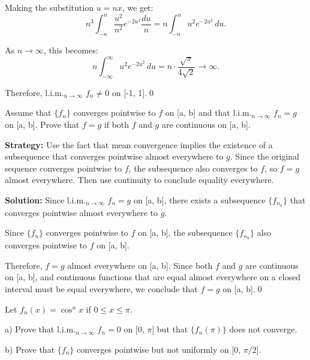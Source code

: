 Making the substitution \( u = nx \), we get:
\[n^3 \int_{-n}^n \frac{u^2}{n^2} e^{-2u^2} \frac{du}{n} = n \int_{-n}^n u^2 e^{-2u^2} \, du.\]

As \( n \to \infty \), this becomes:
\[n \int_{-\infty}^{\infty} u^2 e^{-2u^2} \, du = n \cdot \frac{\sqrt{\pi}}{4\sqrt{2}} \to \infty.\]

Therefore, l.i.m.\(_{n\to\infty}\) \( f_n \neq 0 \) on [-1, 1].\qed


\begin{problembox}
\begin{problemstatement}
Assume that \( \{f_n\} \) converges pointwise to \( f \) on [a, b] and that l.i.m.\(_{n\to\infty}\) \( f_n = g \) on [a, b]. Prove that \( f = g \) if both \( f \) and \( g \) are continuous on [a, b].
\end{problemstatement}
\end{problembox}

\noindent\textbf{Strategy:} Use the fact that mean convergence implies the existence of a subsequence that converges pointwise almost everywhere to \( g \). Since the original sequence converges pointwise to \( f \), the subsequence also converges to \( f \), so \( f = g \) almost everywhere. Then use continuity to conclude equality everywhere.

\bigskip\noindent\textbf{Solution:} Since l.i.m.\(_{n\to\infty}\) \( f_n = g \) on [a, b], there exists a subsequence \( \{f_{n_k}\} \) that converges pointwise almost everywhere to \( g \).

Since \( \{f_n\} \) converges pointwise to \( f \) on [a, b], the subsequence \( \{f_{n_k}\} \) also converges pointwise to \( f \) on [a, b].

Therefore, \( f = g \) almost everywhere on [a, b]. Since both \( f \) and \( g \) are continuous on [a, b], and continuous functions that are equal almost everywhere on a closed interval must be equal everywhere, we conclude that \( f = g \) on [a, b].\qed


\begin{problembox}
\begin{problemstatement}
Let \( f_n(x) = \cos^n x \) if \( 0 \leq x \leq \pi \).

a) Prove that l.i.m.\(_{n\to\infty}\) \( f_n = 0 \) on [0, \(\pi\)] but that \( \{f_n(\pi)\} \) does not converge.

b) Prove that \( \{f_n\} \) converges pointwise but not uniformly on [0, \(\pi/2\)].
\end{problemstatement}
\end{problembox}

